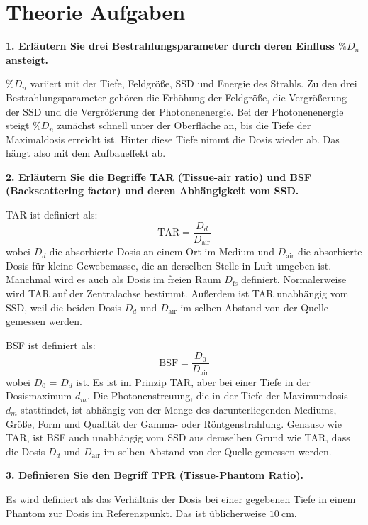 \section{Theorie Aufgaben}
\label{sec:Theorie}

\textbf{1. Erläutern Sie drei Bestrahlungsparameter durch deren Einfluss $\si{\percent}$$D_n$ ansteigt.}


$\si{\percent}$$D_n$ variiert mit der Tiefe, Feldgröße, SSD und Energie des Strahls.
Zu den drei Bestrahlungsparameter gehören die Erhöhung der Feldgröße, die Vergrößerung der SSD und die Vergrößerung der Photonenenergie.
Bei der Photonenenergie steigt $\si{\percent}$$D_n$ zunächst schnell unter der Oberfläche an, bis die Tiefe der Maximaldosis erreicht ist. Hinter diese Tiefe nimmt die Dosis wieder ab. Das hängt also mit dem Aufbaueffekt ab. 

\textbf{
2. Erläutern Sie die Begriffe TAR (Tissue-air ratio) und BSF (Backscattering factor) und deren Abhängigkeit vom SSD.}

TAR ist definiert als: 
\begin{equation*}
\text{TAR} = \frac{D_d}{D_\text{air}}
\end{equation*}
wobei $D_d$ die absorbierte Dosis an einem Ort im Medium und $D_\text{air}$ die absorbierte Dosis für kleine Gewebemasse, die an derselben Stelle in Luft umgeben ist. Manchmal wird es auch als Dosis im freien Raum $D_\text{fs}$ definiert. Normalerweise wird TAR auf der Zentralachse bestimmt. Außerdem ist TAR unabhängig vom SSD, weil die beiden Dosis $D_d$ und $D_\text{air}$ im selben Abstand von der Quelle gemessen werden. 

BSF ist definiert als: 
\begin{equation*}
\text{BSF} = \frac{D_0}{D_\text{air}}
\end{equation*}
wobei $D_0$ = $D_d$ ist. Es ist im Prinzip TAR, aber bei einer Tiefe in der Dosismaximum $d_m$. Die Photonenstreuung, die in der Tiefe der Maximumdosis $d_m$ stattfindet, ist abhängig von der Menge des darunterliegenden Mediums, Größe, Form und Qualität der Gamma- oder Röntgenstrahlung. Genauso wie TAR, ist BSF auch unabhängig vom SSD aus demselben Grund wie TAR, dass die Dosis $D_d$ und $D_\text{air}$ im selben Abstand von der Quelle gemessen werden. 

\textbf{3. Definieren Sie den Begriff TPR (Tissue-Phantom Ratio).}

Es wird definiert als das Verhältnis der Dosis bei einer gegebenen Tiefe in einem Phantom zur Dosis im Referenzpunkt. Das ist üblicherweise $\SI{10}{\centi\meter}$.

